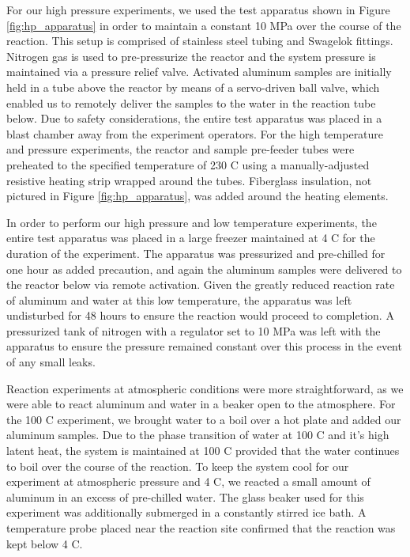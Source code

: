 \documentclass[preprint,12pt,3p]{elsarticle}
\begin{document}
For our high pressure experiments, we used the test apparatus shown in Figure
\ref{fig:hp_apparatus} in order to maintain a constant 10 MPa over the course of
the reaction. This setup is comprised of stainless steel tubing and Swagelok
fittings. Nitrogen gas is used to pre-pressurize the reactor and the system
pressure is maintained via a pressure relief valve. Activated aluminum samples
are initially held in a tube above the reactor by means of a servo-driven ball
valve, which enabled us to remotely deliver the samples to the water in the
reaction tube below. Due to safety considerations, the entire test apparatus was
placed in a blast chamber away from the experiment operators. For the high
temperature and pressure experiments, the reactor and sample pre-feeder tubes
were preheated to the specified temperature of 230 \textdegree C using a
manually-adjusted resistive heating strip wrapped around the tubes.  Fiberglass
insulation, not pictured in Figure \ref{fig:hp_apparatus}, was added around the
heating elements.

In order to perform our high pressure and low temperature experiments, the
entire test apparatus was placed in a large freezer maintained at 4 \textdegree
C for the duration of the experiment. The apparatus was pressurized and
pre-chilled for one hour as added precaution, and again the aluminum samples
were delivered to the reactor below via remote activation. Given the greatly
reduced reaction rate of aluminum and water at this low temperature, the
apparatus was left undisturbed for 48 hours to ensure the reaction would
proceed to completion. A pressurized tank of nitrogen with a regulator set to 10
MPa was left with the apparatus to ensure the pressure remained constant over
this process in the event of any small leaks.

Reaction experiments at atmospheric conditions were more straightforward, as we
were able to react aluminum and water in a beaker open to the atmosphere. For
the 100 \textdegree C experiment, we brought water to a boil over a hot plate
and added our aluminum samples. Due to the phase transition of water at 100
\textdegree C and it's high latent heat, the system is maintained at 100
\textdegree C provided that the water continues to boil over the course of the
reaction. To keep the system cool for our experiment at atmospheric pressure and
4 \textdegree C, we reacted a small amount of aluminum in an excess of
pre-chilled water. The glass beaker used for this experiment was additionally
submerged in a constantly stirred ice bath. A temperature probe placed near the
reaction site confirmed that the reaction was kept below 4 \textdegree C.
\end{document}
